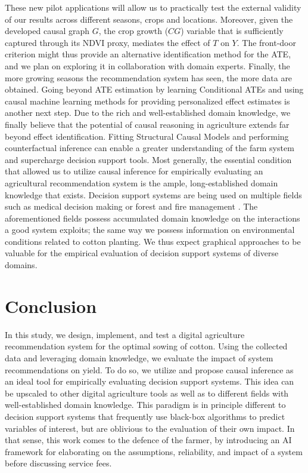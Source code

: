 \documentclass[letterpaper]{article} %
\begin{document}
These new pilot applications will allow us to practically test the external validity of our results across different seasons, crops and locations. Moreover, given the developed causal graph $G$, the crop growth ($CG$) variable that is sufficiently captured through its NDVI proxy, mediates the effect of $T$ on $Y$. The front-door criterion \cite{pearl2009causality} might thus provide an alternative identification method for the ATE, and we plan on exploring it in collaboration with domain experts. Finally, the more growing seasons the recommendation system has seen, the more data are obtained. Going beyond ATE estimation by learning Conditional ATEs and using causal machine learning methods for providing personalized effect estimates is another next step. Due to the rich and well-established domain knowledge, we finally believe that the potential of causal reasoning in agriculture extends far beyond effect identification. Fitting Structural Causal Models and performing counterfactual inference can enable a greater understanding of the farm system and supercharge decision support tools.  Most generally, the essential condition that allowed us to utilize causal inference for empirically evaluating an agricultural recommendation system is the ample, long-established domain knowledge that exists. Decision support systems are being used on multiple fields \cite{marakas2003decision} such as medical decision making \cite{sutton2020overview} or forest and fire management \cite{segura2014decision, martell2015review}. The aforementioned fields possess accumulated domain knowledge on the interactions a good system exploits; the same way we possess information on environmental conditions related to cotton planting. We thus expect graphical approaches to be valuable for the empirical evaluation of decision support systems of diverse domains.

\vspace{-3.81mm}
\section{Conclusion}

In this study, we design, implement, and test a digital agriculture recommendation system for the optimal sowing of cotton. Using the collected data and leveraging domain knowledge, we evaluate the impact of system recommendations on yield. To do so, we utilize and propose causal inference as an ideal tool for empirically evaluating decision support systems.
This idea can be upscaled to other digital agriculture tools as well as to different fields with well-established domain knowledge. This paradigm is in principle different to decision support systems that frequently use black-box algorithms to predict variables of interest, but are oblivious to the evaluation of their own impact. In that sense, this work comes to the defence of the farmer, by introducing an AI framework for elaborating on the assumptions, reliability, and impact of a system before discussing service fees.
\end{document}
